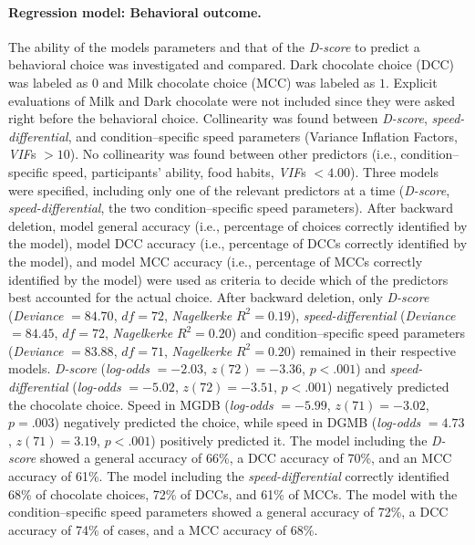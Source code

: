 \documentclass[12pt]{book}
\begin{document}
\paragraph{Regression model: Behavioral outcome.}
The ability of the models parameters and that of the \emph{D-score} to predict a behavioral choice was investigated and compared.
Dark chocolate choice (DCC) was labeled as $0$ and Milk chocolate choice (MCC) was labeled as $1$. Explicit evaluations of Milk and Dark chocolate were not included since they were asked right before the behavioral choice. Collinearity was found between \emph{D-score}, \emph{speed-differential}, and condition--specific speed parameters (Variance Inflation Factors, \emph{VIF}s $> 10$). No collinearity was found between other predictors (i.e., condition--specific speed, participants' ability, food habits, \emph{VIF}s $< 4.00$).  
Three models were specified, including only one of the relevant predictors at a time (\emph{D-score}, \emph{speed-differential}, the two condition--specific speed parameters). After backward deletion, model general accuracy (i.e., percentage of choices correctly identified by the model), model DCC accuracy (i.e., percentage of DCCs correctly identified by the model), and model MCC accuracy (i.e., percentage of MCCs correctly identified by the model) were used as criteria to decide which of the predictors best accounted for the actual choice. 
After backward deletion, only \emph{D-score} (\emph{Deviance }$= 84.70$, $df =72$, \emph{Nagelkerke} $R^2 = 0.19$), \emph{speed-differential} (\emph{Deviance }$= 84.45$, $df =72$, \emph{Nagelkerke} $R^2 = 0.20$) and condition--specific speed parameters (\emph{Deviance }$= 83.88$, $df =71$, \emph{Nagelkerke} $R^2 = 0.20$) remained in their respective models. 
\emph{D-score} (\emph{log-odds} $= -2.03$, $z(72) = -3.36$, $p < .001$) and \emph{speed-differential} (\emph{log-odds} $= -5.02$, $z(72) = -3.51$, $p < .001$) negatively predicted the chocolate choice. Speed in MGDB (\emph{log-odds} $= -5.99$, $z(71) = -3.02$, $p = .003$) negatively predicted the choice, while speed in DGMB (\emph{log-odds} $= 4.73$, $z(71) = 3.19$, $p < .001$) positively predicted it.
The model including the \emph{D-score} showed a general accuracy of 66\%, a DCC accuracy of 70\%, and an MCC accuracy of 61\%. The model including the \emph{speed-differential} correctly identified 68\% of chocolate choices, 72\% of DCCs, and 61\% of MCCs. The model with the condition--specific speed parameters showed a general accuracy of 72\%, a DCC accuracy of 74\% of cases, and a MCC accuracy of 68\%. 
\end{document}
